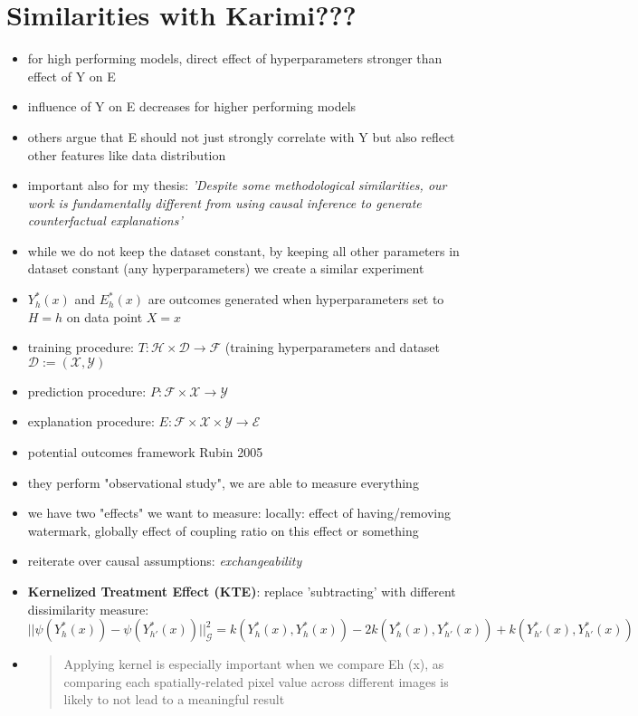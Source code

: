 \section{Similarities with Karimi???}
\begin{itemize}
    \item for high performing models, direct effect of hyperparameters stronger than effect of Y on E
    \item influence of Y on E decreases for higher performing models
    \item others argue that E should not just strongly correlate with Y but also reflect other features like data distribution
    \item important also for my thesis: \textit{'Despite some methodological similarities, our work is fundamentally different from using causal inference to generate counterfactual explanations'}
    \item while we do not keep the dataset constant, by keeping all other parameters in dataset constant (any hyperparameters) we create a similar experiment
    \item $Y_h^*(x)$ and $E_h^*(x)$ are outcomes generated when hyperparameters set to $H= h$ on data point $X=x$
    \item training procedure: $T: \mathcal{H} \times \mathcal{D} \rightarrow \mathcal{F}$ (training hyperparameters and dataset $\mathcal{D}:= (\mathcal{X,Y})$
    \item prediction procedure: $P: \mathcal{F} \times \mathcal{X} \rightarrow \mathcal{Y}$
    \item explanation procedure: $E: \mathcal{F} \times \mathcal{X} \times \mathcal{Y} \rightarrow \mathcal{E}$ 
    \item potential outcomes framework Rubin 2005 \cite{Rubin2005}
    \item they perform "observational study", we are able to measure everything
    \item we have two "effects" we want to measure: locally: effect of having/removing watermark, globally effect of coupling ratio on this effect or something
    \item reiterate over causal assumptions: \textit{exchangeability}
    \item \textbf{Kernelized Treatment Effect (KTE)}: replace 'subtracting' with different dissimilarity measure: $
    ||\psi(Y_h^*(x)) - \psi(Y_{h'}^*(x))||_{\mathcal{G}}^2 =   k(Y_h^*(x), Y_h^*(x)) - 2k(Y_h^*(x),Y_{h'}^*(x)) + k(Y_{h'}^*(x),Y_{h'}^*(x))  
    $
    \item \begin{quote}Applying kernel is especially important when we compare Eh (x), as comparing each spatially-related pixel value across different images is likely to not lead to a meaningful result

\end{quote}
\end{itemize}
